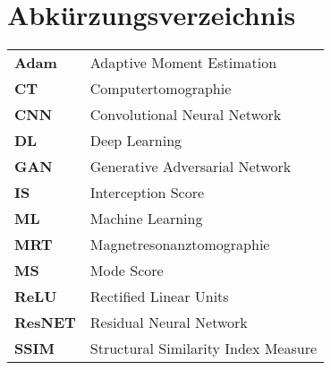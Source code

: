 
\chapter*{Abkürzungsverzeichnis}
\begin{longtable}{ll}
\textbf{Adam} & Adaptive Moment Estimation \\
\textbf{CT} & Computertomographie \\
\textbf{CNN} & Convolutional Neural Network \\
\textbf{DL} & Deep Learning \\
\textbf{GAN}  & Generative Adversarial Network \\ 
\textbf{IS} & Interception Score \\
\textbf{ML} & Machine Learning\\
\textbf{MRT} & Magnetresonanztomographie \\
\textbf{MS} & Mode Score\\
\textbf{ReLU} & Rectified Linear Units\\
\textbf{ResNET} & Residual Neural Network\\
\textbf{SSIM} & Structural Similarity Index Measure\\
\end{longtable}

\cleardoublepage